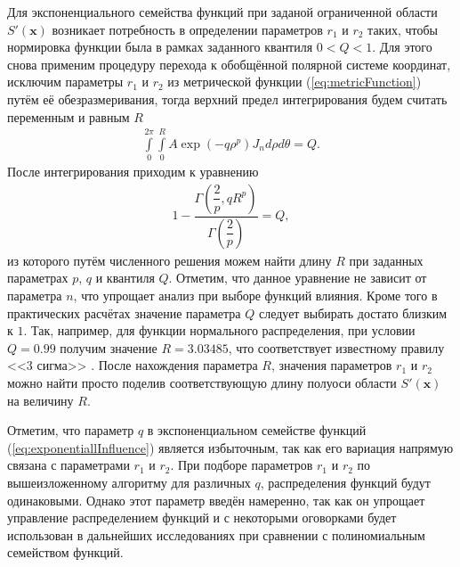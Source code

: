 Для экспоненциального семейства функций при заданой ограниченной области $S'(\boldsymbol{x})$ возникает потребность в определении параметров $r_1$ и $r_2$ таких, чтобы нормировка функции была в рамках заданного квантиля $0 < Q < 1$. Для этого снова применим процедуру перехода к обобщённой полярной системе координат, исключим параметры $r_1$ и $r_2$ из метрической функции (\ref{eq:metricFunction}) путём её обезразмеривания, тогда верхний предел интегрирования будем считать переменным и равным $R$
\begin{gather*}
	\int\limits_0^{2\pi}
		\int\limits_0^{R}
			A \exp \left(-q\rho^p \right) J_n
		d \rho
	d \theta = Q.
\end{gather*}
После интегрирования приходим к уравнению
\begin{gather}
	\label{eq:quantil}
	1 - \dfrac{
		\Gamma \left( \dfrac{2}{p}, q R^p \right)
		}{
		\Gamma \left( \dfrac{2}{p} \right)
		} = Q,
\end{gather}
из которого путём численного решения можем найти длину $R$ при заданных параметрах $p$, $q$ и квантиля $Q$. Отметим, что данное уравнение не зависит от параметра $n$, что упрощает анализ при выборе функций влияния. Кроме того в практических расчётах значение параметра $Q$ следует выбирать достато близким к $1$. Так, например, для функции нормального распределения, при условии $Q = 0.99$ получим значение $R = 3.03485$, что соответствует известному правилу <<3 сигма>> \cite{TeorVer}. После нахождения параметра $R$, значения параметров $r_1$ и $r_2$ можно найти просто поделив соответствующую длину полуоси области $S' (\boldsymbol{x})$ на величину $R$.

Отметим, что параметр $q$ в экспоненциальном семействе функций (\ref{eq:exponentiallInfluence}) является избыточным, так как его вариация напрямую связана с параметрами $r_1$ и $r_2$. При подборе параметров $r_1$ и $r_2$ по вышеизложенному алгоритму для различных $q$, распределения функций будут одинаковыми. Однако этот параметр введён намеренно, так как он упрощает управление распределением функций и с некоторыми оговорками будет использован в дальнейших исследованиях при сравнении с полиномиальным семейством функций.